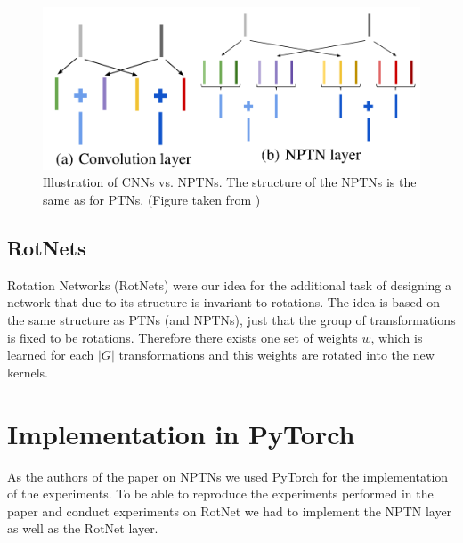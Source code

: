 \documentclass{llncs}
\begin{document}
\begin{figure}
	\begin{center}
	\includegraphics[scale=0.15]{result_images/nptn_paper.png}
	\caption{Illustration of CNNs vs. NPTNs. The structure of the NPTNs is the same as for PTNs. (Figure taken from \cite{NPTN18})}
	\label{pic:nptn}
	\end{center}
\end{figure}

\subsection{RotNets}
Rotation Networks (RotNets) were our idea for the additional task of designing a network that due to its structure is invariant to rotations. 
The idea is based on the same structure as PTNs (and NPTNs), just that the group of transformations is fixed to be rotations. Therefore there exists one set of weights $w$, which is learned for each $|G|$ transformations and this weights are rotated into the new kernels. 
\newcommand{\pytorch}{PyTorch }
\section{Implementation in \pytorch}
\newcommand{\nnaffinegrid}{\nolinkurl{nn.functional.affine\textunderscore grid} }
\newcommand{\nngridsample}{\nolinkurl{nn.functional.grid\textunderscore sample} }
\newcommand{\nnConvFunction}{\nolinkurl{nn.functional.conv2d} }
\newcommand{\nnConvLayer}{\nolinkurl{nn.Conv2d} }
\newcommand{\nnMaxPool}{\nolinkurl{nn.MaxPool3d} }
\newcommand{\nnAvgPool}{\nolinkurl{nn.AvgPool3d} }
\newcommand{\nnTensor}{\nolinkurl{nn.Tensor} }
\newcommand{\nnParameter}{\nolinkurl{torch.nn.Parameter} }

As the authors of the paper on NPTNs \cite{NPTN18} we used \pytorch for the implementation of the experiments.
To be able to reproduce the experiments performed in the paper and conduct experiments on RotNet we had to implement the NPTN layer as well as the RotNet layer.
\end{document}
